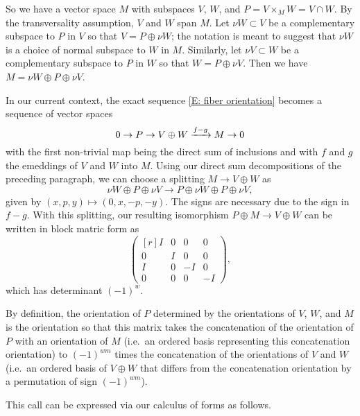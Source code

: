 So we have a vector space $M$ with subspaces $V$, $W$, and $P = V \times_M W = V \cap W$. 
By the transversality assumption, $V$ and $W$ span $M$. 
Let $\nu W \subset V$ be a complementary subspace to $P$ in $V$ so that $V = P \oplus \nu W$; the notation is meant to suggest that $\nu W$ is a choice of normal subspace to $W$ in $M$. 
Similarly, let $\nu V \subset W$ be a complementary subspace to $P$ in $W$ so that $W = P \oplus \nu V$.
Then we have $M = \nu W \oplus P \oplus \nu V$. 


In our current context, the exact sequence \eqref{E: fiber orientation} becomes a sequence of vector spaces 
\begin{equation*}
	0 \to P \to V \oplus W \xrightarrow{f-g} M \to 0
\end{equation*}
with the first non-trivial map being the direct sum of inclusions and with $f$ and $g$ the emeddings of $V$ and $W$ into $M$. 
Using our direct sum decompositions of the preceding paragraph, we can choose a splitting $M \to V \oplus W$ as
$$\nu W \oplus P \oplus \nu V \to P \oplus \nu W \oplus P \oplus \nu V,$$
given by $(x,p,y) \mapsto (0, x, -p, -y)$.
The signs are necessary due to the sign in $f-g$.
With this splitting, our resulting isomorphism $P \oplus M \to V \oplus W$ can be written in block matric form as
\begin{equation}\label{E: orientation matrix}
	\begin{pmatrix*}[r]
		I&0&0&0\\
		0&I&0&0\\
		I&0&-I&0\\
		0&0&0&-I
	\end{pmatrix*},
\end{equation}
which has determinant $(-1)^{w}$.

By definition, the orientation of $P$ determined by the orientations of $V$, $W$, and $M$ is the orientation so that this matrix takes the concatenation of the orientation of $P$ with an orientation of $M$ (i.e.\ an ordered basis representing this concatenation orientation) to $(-1)^{wm}$ times the concatenation of the orientations of $V$ and $W$ (i.e.\ an ordered basis of $V \oplus W$ that differs from the concatenation orientation by a permutation of sign $(-1)^{wm}$). 

This call can be expressed via our calculus of forms as follows.

